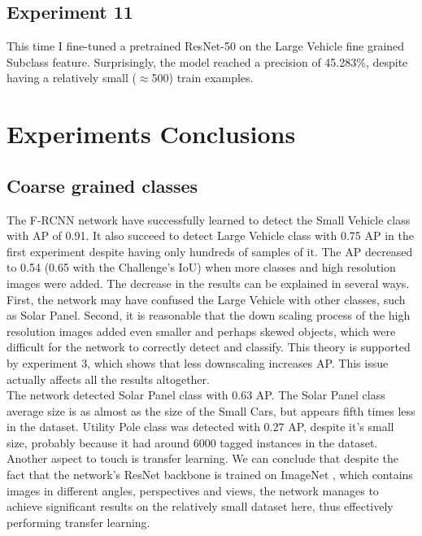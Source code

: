 \documentclass[]{article}
\begin{document}
\subsection{Experiment 11}
This time I fine-tuned a pretrained ResNet-50 on the Large Vehicle fine grained Subclass feature. Surprisingly, the model reached a precision of 45.283\%, despite having a relatively small ($\approx$500) train examples.

\section{Experiments Conclusions}
\subsection{Coarse grained classes}
The F-RCNN \cite{fasterrcnn} network have successfully learned to detect the Small Vehicle class with AP of 0.91. It also succeed to detect Large Vehicle class with 0.75 AP in the first experiment despite having only hundreds of samples of it. The AP decreased to 0.54 (0.65 with the Challenge's IoU) when more classes and high resolution images were added. The decrease in the results can be explained in several ways. First, the network may have confused the Large Vehicle with other classes, such as Solar Panel. Second, it is reasonable that the down scaling process of the high resolution images added even smaller and perhaps skewed objects, which were difficult for the network to correctly detect and classify. This theory is supported by experiment 3, which shows that less downscaling increases AP. This issue actually affects all the results altogether.\\
The network detected Solar Panel class with 0.63 AP. The Solar Panel class average size is as almost as the size of the Small Cars, but appears fifth times less in the dataset. Utility Pole class was detected with 0.27 AP, despite it's small size, probably because it had around 6000 tagged instances in the dataset.\\
Another aspect to touch is transfer learning. We can conclude that despite the fact that the network's ResNet \cite{resnet} backbone is trained on ImageNet \cite{imagenet}, which contains images in different angles, perspectives and views, the network manages to achieve significant results on the relatively small dataset here, thus effectively performing transfer learning.
\end{document}
